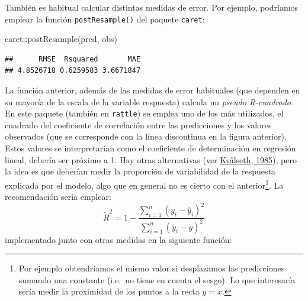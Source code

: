 \documentclass[
  spanish,
]{book}
\newenvironment{Shaded}{\begin{snugshade}}{\end{snugshade}}
\newcommand{\FunctionTok}[1]{\textcolor[rgb]{0.00,0.00,0.00}{#1}}
\newcommand{\NormalTok}[1]{#1}
\newcommand{\SpecialCharTok}[1]{\textcolor[rgb]{0.00,0.00,0.00}{#1}}
\theoremstyle{break}
\theoremstyle{definition}
\theoremstyle{definition}
\theoremstyle{definition}
\theoremstyle{definition}
\theoremstyle{remark}
\begin{document}
También es habitual calcular distintas medidas de error.
Por ejemplo, podríamos emplear la función \texttt{postResample()} del paquete \texttt{caret}:

\begin{Shaded}
\begin{Highlighting}[]
\NormalTok{caret}\SpecialCharTok{::}\FunctionTok{postResample}\NormalTok{(pred, obs)}
\end{Highlighting}
\end{Shaded}

\begin{verbatim}
##      RMSE  Rsquared       MAE 
## 4.8526718 0.6259583 3.6671847
\end{verbatim}

La función anterior, además de las medidas de error habituales (que dependen en su mayoría de la escala de la variable respuesta) calcula un \emph{pseudo R-cuadrado}.
En este paquete (también en \texttt{rattle}) se emplea uno de los más utilizados, el cuadrado del coeficiente de correlación entre las predicciones y los valores observados (que se corresponde con la línea discontinua en la figura anterior).
Estos valores se interpretarían como el coeficiente de determinación en regresión lineal, debería ser próximo a 1.
Hay otras alternativas (ver \protect\hyperlink{ref-kvaalseth1985cautionary}{Kvålseth, 1985}), pero la idea es que deberían medir la proporción de variabilidad de la respuesta explicada por el modelo, algo que en general no es cierto con el anterior\footnote{Por ejemplo obtendríamos el mismo valor si desplazamos las predicciones sumando una constante (i.e.~no tiene en cuenta el sesgo). Lo que interesaría sería medir la proximidad de los puntos a la recta \(y=x\).}.
La recomendación sería emplear:
\[\tilde R^2 = 1 - \frac{\sum_{i=1}^n(y_i - \hat y_i)^2}{\sum_{i=1}^n(y_i - \bar y)^2}\]
implementado junto con otras medidas en la siguiente función:
\end{document}

